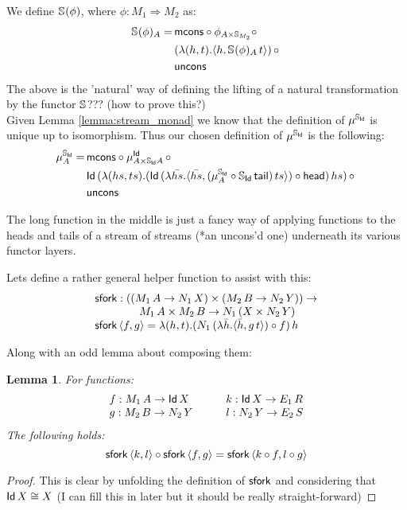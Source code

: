 \documentclass{article}
\newtheorem{lemma}[definition]{Lemma}
\begin{document}
We define $\mathbb{S}_{}(\phi)$, where $\phi: M_1 \Rightarrow M_2$ as:
\begin{align*}
	\mathbb{S}_{}(\phi)_A =\,&\mathsf{mcons} \circ \phi_{A \times \mathbb{S}_{M_2}} \circ\, \\
	&(\lambda (h, t).\langle h, \mathbb{S}_{}(\phi)_A\, t \rangle)\, \circ\, \\ 
	&\mathsf{uncons}
\end{align*}
The above is the 'natural' way of defining the lifting of a natural transformation by the functor $\mathbb{S}_{}$??? (how to prove this?) \\

Given Lemma \ref{lemma:stream_monad} we know that the definition of $\mu^{\mathbb{S}_{\mathsf{Id}}}$ is unique up to isomorphism. Thus our chosen definition of $\mu^{\mathbb{S}_{\mathsf{Id}}}$ is the following:
\begin{align*}
	\mu^{\mathbb{S}_{\mathsf{Id}}}_A =\, &\mathsf{mcons} \circ \mu^{\mathsf{Id}}_{A \times \mathbb{S}_{\mathsf{Id}}A}\, \circ\, \\
	&\mathsf{Id}\,(\lambda (hs, ts). (\mathsf{Id}\,(\lambda \bar{hs} . \langle \bar{hs}, (\mu^{\mathbb{S}_{\mathsf{Id}}}_A \circ \mathbb{S}_{\mathsf{Id}}\,\mathsf{tail})\,ts \rangle) \circ \mathsf{head})\,hs)\, \circ\, \\
	&\mathsf{uncons}
\end{align*}

The long function in the middle is just a fancy way of applying functions to the heads and tails of a stream of streams (*an uncons'd one) underneath its various functor layers.

Lets define a rather general helper function to assist with this:
$$
\begin{array}{ll}
\mathsf{sfork} : ((M_1\, A \rightarrow N_1\, X) \times  (M_2\, B \rightarrow N_2\, Y)) \to 
\\ \qquad\qquad M_1\, A \times M_2\, B \to N_1\,(X \times N_2\,Y) \\
\mathsf{sfork}\,\langle f, g \rangle = \lambda (h, t). (N_1\,(\lambda \bar{h} . \langle \bar{h}, g\,t \rangle) \circ f)\,h
\end{array}
$$

Along with an odd lemma about composing them:
\begin{lemma}\label{lemma:sfork_comp}
For functions: 
$$
\begin{array}{ll}
f : M_1\,A \to \mathsf{Id}\,X & \qquad
k : \mathsf{Id}\,X \to E_1\,R  \\
g : M_2\,B \to N_2\,Y &\qquad
l : N_2\,Y \to E_2\,S
\end{array}
$$
The following holds:
$$
\mathsf{sfork}\,\langle k, l \rangle \circ \mathsf{sfork}\,\langle f, g \rangle =  \mathsf{sfork}\,\langle k \circ f, l \circ g \rangle
$$
\end{lemma}
\begin{proof}
This is clear by unfolding the definition of $\mathsf{sfork}$ and considering that $\mathsf{Id}\,X \cong X$ (I can fill this in later but it should be really straight-forward)
\end{proof}
\end{document}
